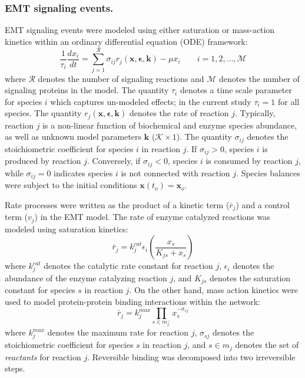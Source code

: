 \documentclass[11pt,letterpaper]{article}
\begin{document}
\subsubsection*{EMT signaling events.}
EMT signaling events were modeled using either saturation or mass-action kinetics within an ordinary differential equation (ODE) framework:
\begin{equation}
	\frac{1}{\tau_{i}}\frac{dx_{i}}{dt}  =  \sum_{j = 1}^{\mathcal{R}}\sigma_{ij}r_{j}\left(\mathbf{x},\mathbf{\epsilon},\mathbf{k}\right)-\mu x_{i}\qquad{i=1,2,\hdots,\mathcal{M}}
\end{equation}
where $\mathcal{R}$ denotes the number of signaling reactions and $\mathcal{M}$ denotes the number of signaling proteins in the model.
The quantity $\tau_{i}$ denotes a time scale parameter for species $i$ which captures un-modeled effects; in the current study $\tau_{i} = 1$ for all species.
The quantity $r_{j}\left(\mathbf{x},\mathbf{\epsilon},\mathbf{k}\right)$ denotes the rate of reaction $j$.
Typically, reaction $j$ is a non-linear function of biochemical and enzyme species abundance, as well as unknown model parameters $\mathbf{k}$ ($\mathcal{K}\times{1}$).
The quantity $\sigma_{ij}$ denotes the stoichiometric coefficient for species $i$ in reaction $j$.
If $\sigma_{ij}>0$, species $i$ is produced by reaction $j$.
Conversely, if $\sigma_{ij}<0$, species $i$ is consumed by reaction $j$, while $\sigma_{ij} = 0$ indicates species $i$ is not connected with reaction $j$.
Species balances were subject to the initial conditions $\mathbf{x}\left(t_{o}\right) = \mathbf{x}_{o}$.

Rate processes were written as the product of a kinetic term ($\bar{r}_{j}$) and a control term ($v_{j}$) in the EMT model.
The rate of enzyme catalyzed reactions was modeled using saturation kinetics:
\begin{equation}\label{eqn:rate-saturation}
	\bar{r}_{j} = k_{j}^{cat}\epsilon_{i}\left(\frac{x_{s}}{K_{js} + x_{s}}\right)
\end{equation}
where $k_{j}^{cat}$ denotes the catalytic rate constant for reaction $j$, $\epsilon_{i}$ denotes the abundance of the enzyme catalyzing reaction $j$,
and $K_{js}$ denotes the saturation constant for species $s$ in reaction $j$.
On the other hand, mass action kinetics were used to model protein-protein binding interactions within the network:
\begin{equation}\label{eqn:rate-action}
	\bar{r}_{j} = k_{j}^{max}\prod_{s\in{m_{j}^{-}}}x_{s}^{-\sigma_{sj}}
\end{equation}
where $k_{j}^{max}$ denotes the maximum rate for reaction $j$, $\sigma_{sj}$ denotes the stoichiometric coefficient for species $s$ in reaction $j$,
and $s\in{m_{j}}$ denotes the set of \textit{reactants} for reaction $j$. Reversible binding was decomposed into two irreversible steps.
\end{document}
